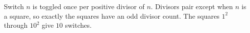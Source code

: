 Switch $n$ is toggled once per positive divisor of $n$. Divisors pair except when $n$ is a square, so exactly the squares have an odd divisor count. The squares $1^2$ through $10^2$ give $\boxed{10}$ switches.
